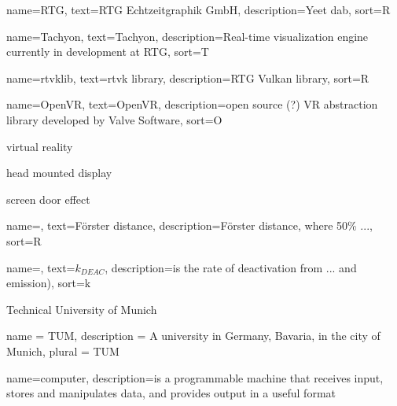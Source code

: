 
{
  name=RTG,
  text=RTG Echtzeitgraphik GmbH,
  description={Yeet dab}, 
  sort=R
}

{
  name=Tachyon,
  text=Tachyon,
  description={Real-time visualization engine currently in development at \gls{RTG}}, 
  sort=T
}

{
  name=rtvklib,
  text=rtvk library,
  description={\gls{RTG} Vulkan library}, 
  sort=R
}

{
  name=OpenVR,
  text=OpenVR,
  description={open source (?) \gls{VR} abstraction library developed by Valve Software}, 
  sort=O
}

{virtual reality}

{head mounted display}

{screen door effect}







{
  name=,
  text=F\"{o}rster distance,
  description={F\"{o}rster distance, where 50\% ...}, 
  sort=R
}

{
  name=,
  text=$k_{DEAC}$, 
  description={is the rate of deactivation from ... and emission)}, 
  sort=k
}

{Technical University of Munich}

{
  name = TUM,
  description = {A university in Germany, Bavaria, in the city of Munich},
  plural = TUM
}

{
  name=computer,
  description={is a programmable machine that receives input,
               stores and manipulates data, and provides
               output in a useful format}
}